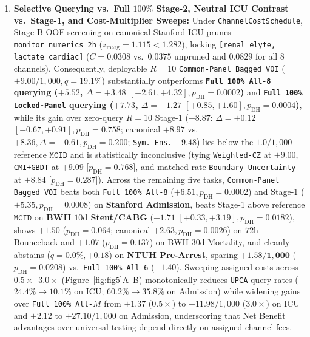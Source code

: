\documentclass[11pt]{article}
\theoremstyle{remark}
\begin{document}
\begin{enumerate}
  \item \textbf{Selective Querying vs.\ Full $100\%$ Stage-2, Neutral ICU Contrast vs.\ Stage-1, and Cost-Multiplier Sweeps:} Under \texttt{ChannelCostSchedule}, Stage-B OOF screening on canonical Stanford ICU prunes \texttt{monitor\_numerics\_2h} ($z_{\text{marg}}=1.115 < 1.282$), locking \texttt{[renal\_elyte, lactate\_cardiac]} ($C=0.0308$ vs.\ $0.0375$ unpruned and $0.0829$ for all $8$ channels). Consequently, deployable $R=10$ \texttt{Common-Panel Bagged VOI} ($+9.00/1{,}000, q=19.1\%$) substantially outperforms \textbf{\texttt{Full 100\% All-8} querying ($+5.52$, $\Delta=+3.48$ $[+2.61, +4.32], p_{\text{DH}}=0.0002$)} and \textbf{\texttt{Full 100\% Locked-Panel} querying ($+7.73$, $\Delta=+1.27$ $[+0.85, +1.60], p_{\text{DH}}=0.0004$)}, while its gain over zero-query $R=10$ Stage-1 ($+8.87$: $\Delta=+0.12$ $[-0.67, +0.91], p_{\text{DH}}=0.758$; canonical $+8.97$ vs.\ $+8.36, \Delta=+0.61, p_{\text{DH}}=0.200$; \texttt{Sym.\ Ens.} $+9.48$) lies below the $1.0/1{,}000$ reference $\texttt{MCID}$ and is statistically inconclusive (tying \texttt{Weighted-CZ} at $+9.00$, \texttt{CMI+GBDT} at $+9.09$ [$p_{\text{DH}}=0.768$], and matched-rate \texttt{Boundary Uncertainty} at $+8.84$ [$p_{\text{DH}}=0.287$]). Across the remaining five tasks, \texttt{Common-Panel Bagged VOI} beats both \texttt{Full 100\% All-8} ($\mathbf{+6.51}, p_{\text{DH}}=0.0002$) and Stage-1 ($\mathbf{+5.35}, p_{\text{DH}}=0.0008$) on \textbf{Stanford Admission}, beats Stage-1 above reference $\texttt{MCID}$ on \textbf{BWH $10\text{d}$ Stent/CABG} ($\mathbf{+1.71}$ $[+0.33, +3.19], p_{\text{DH}}=0.0182$), shows $+1.50$ ($p_{\text{DH}}=0.064$; canonical $+2.63, p_{\text{DH}}=0.0026$) on $72\text{h}$ Bounceback and $+1.07$ ($p_{\text{DH}}=0.137$) on BWH $30\text{d}$ Mortality, and cleanly abstains ($q=0.0\%, +0.18$) on \textbf{NTUH Pre-Arrest}, sparing $\mathbf{+1.58/1{,}000}$ ($p_{\text{DH}}=0.0208$) vs.\ \texttt{Full 100\% All-6} ($-1.40$). Sweeping assigned costs across $0.5\times\text{--}3.0\times$ (Figure~\ref{fig:fig5}A--B) monotonically reduces \texttt{UPCA} query rates ($24.4\%\to 10.1\%$ on ICU; $60.2\%\to 35.8\%$ on Admission) while widening gains over \texttt{Full 100\% All-$M$} from $+1.37$ ($0.5\times$) to $+11.98/1{,}000$ ($3.0\times$) on ICU and $+2.12$ to $+27.10/1{,}000$ on Admission, underscoring that Net Benefit advantages over universal testing depend directly on assigned channel fees.

\end{enumerate}
\end{document}
